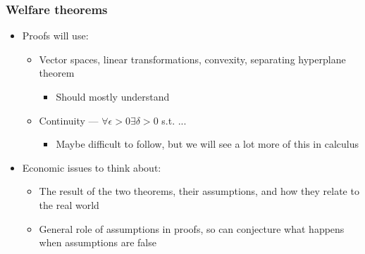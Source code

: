 \documentclass[compress]{beamer}
\begin{document}
\begin{frame}
  \frametitle{Welfare theorems}
  \begin{itemize}
  \item Proofs will use:
    \begin{itemize}
    \item Vector spaces, linear transformations, convexity, separating
      hyperplane theorem
      \begin{itemize}
      \item Should mostly understand
      \end{itemize}
    \item Continuity --- $\forall \epsilon > 0 \exists \delta > 0$
      s.t. ...
      \begin{itemize}
      \item Maybe difficult to follow, but we will see a lot more of
        this in calculus
      \end{itemize}
    \end{itemize}
  \item Economic issues to think about:
    \begin{itemize}
    \item The result of the two theorems, their assumptions, and how
      they relate to the real world
    \item General role of assumptions in proofs, so can conjecture
      what happens when assumptions are false 
    \end{itemize}
  \end{itemize}
\end{frame}

\end{document}
